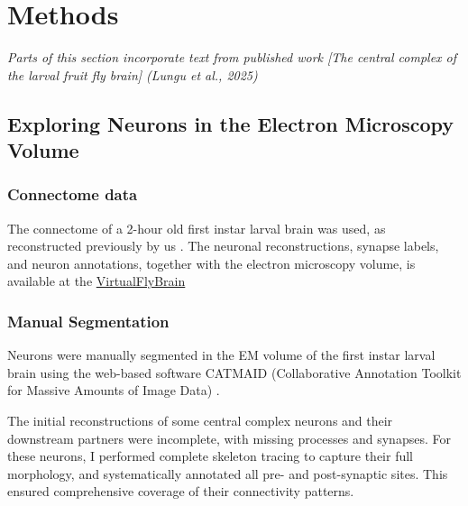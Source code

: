 
\chapter{Methods}
\textit{Parts of this section incorporate text from published work [The central complex of the larval fruit fly brain] (Lungu et al., 2025)}


\section{Exploring Neurons in the Electron Microscopy Volume}
    \subsection{Connectome data}
    The connectome of a 2-hour old first instar larval brain was used, as reconstructed previously by us \citep{winding2023connectome}. The neuronal reconstructions, synapse labels, and neuron annotations, together with the electron microscopy volume, is available at the \href{https://l1em.catmaid.virtualflybrain.org/?pid=1&zp=108250&yp=82961.59999999999&xp=54210.799999999996&tool=tracingtool&sid0=1&s0=2.4999999999999996&help=true&layout=h(XY,%20%7B%20type:%20%22neuron-search%22,%20id:%20%22neuron-search-1%22,%20options:%20%7B%22annotation-name%22:%20%22papers%22%7D%7D,%200.6)}{VirtualFlyBrain}
  
    \subsection{Manual Segmentation}
    Neurons were manually segmented in the EM volume of the first instar larval brain using the web-based software CATMAID (Collaborative Annotation Toolkit for Massive Amounts of Image Data) \citep{schneider2016quantitative, saalfeld2009catmaid}. 

    The initial reconstructions of some central complex neurons and their downstream partners were incomplete, with missing processes and synapses. For these neurons, I performed complete skeleton tracing to capture their full morphology, and systematically annotated all pre- and post-synaptic sites. This ensured comprehensive coverage of their connectivity patterns.
    
